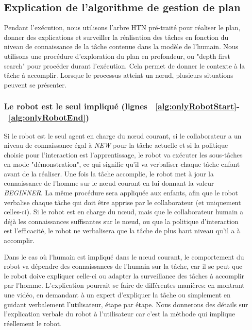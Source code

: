 \documentclass[a4paper,11pt,twoside]{StyleThese}
\begin{document}
\subsection{Explication de l'algorithme de gestion de plan}
Pendant l'exécution, nous utilisons l'arbre HTN pré-traité pour réaliser le plan, donner des explications et surveiller la réalisation des tâches en fonction du niveau de connaissance de la tâche contenue dans la modèle de l'humain.
Nous utilisons une procédure d'exploration du plan en profondeur, ou "depth first search" pour procéder durant l'exécution. Cela permet de donner le contexte à la tâche à accomplir.
Lorsque le processus atteint un nœud, plusieurs situations peuvent se présenter.

\subsubsection{Le robot est le seul impliqué (lignes ~\ref{alg:onlyRobotStart}-~\ref{alg:onlyRobotEnd})} Si le robot est le seul agent en charge du nœud courant, si le collaborateur a un niveau de connaissance égal à \textit{NEW} pour la tâche actuelle et si la politique choisie pour l'interaction est l'apprentissage, le robot va exécuter les sous-tâches en mode "démonstration", ce qui signifie qu'il va verbaliser chaque tâche-enfant avant de la réaliser. Une fois la tâche accomplie, le robot met à jour la connaissance de l'homme sur le nœud courant en lui donnant la valeur \textit{BEGINNER}. La même procédure sera appliquée aux enfants, afin que le robot verbalise chaque tâche qui doit être apprise par le collaborateur (et uniquement celles-ci).
Si le robot est en charge du nœud, mais que le collaborateur humain a déjà les connaissances suffisantes sur le nœud, ou que la politique d'interaction est l'efficacité, le robot ne verbalisera que la tâche de plus haut niveau qu'il a à accomplir.

Dans le cas où l'humain est impliqué dans le nœud courant, le comportement du robot va dépendre des connaissances de l'humain sur la tâche, car il se peut que le robot doive expliquer celle-ci ou adapter la surveillance des tâches à accomplir par l'homme.
L'explication pourrait se faire de différentes manières: en montrant une vidéo, en demandant à un expert d'expliquer la tâche ou simplement en guidant verbalement l'utilisateur, étape par étape. Nous donnerons des détails sur l'explication verbale du robot à l'utilisateur car c'est la méthode qui implique réellement le robot.
\end{document}
